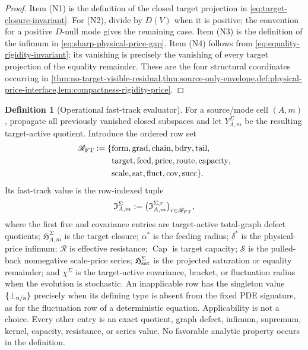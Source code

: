\documentclass[11pt]{article}
\numberwithin{section}{part}
\theoremstyle{plain}
\theoremstyle{definition}
\newtheorem{definition}[definition]{Definition}
\theoremstyle{remark}
\begin{document}
\begin{proof}
Item \textup{(N1)} is the definition of the closed target projection in
\eqref{eq:target-closure-invariant}.  For \textup{(N2)}, divide by \(D(V)\)
when it is positive; the convention for a positive \(D\)-null mode gives the
remaining case.  Item \textup{(N3)} is the definition of the infimum in
\eqref{eq:sharp-physical-price-gap}.  Item \textup{(N4)} follows from
\eqref{eq:equality-rigidity-invariant}: its vanishing is precisely the
vanishing of every target projection of the equality remainder.  These are
the four structural coordinates occurring in
\cref{thm:no-target-visible-residual,thm:source-only-envelope,def:physical-price-interface,lem:compactness-rigidity-price}.
\end{proof}

\begin{definition}[Operational fast-track evaluator]
\label{def:operational-fast-track-evaluator}
For a source/mode cell \((A,m)\), propagate all previously vanished closed
subspaces and let \(Y_{A,m}^{\Sigma}\) be the resulting target-active
quotient.  Introduce the ordered row set
\begin{equation}
 \label{eq:fast-track-row-set}
 \begin{aligned}
 \mathscr R_{\rm FT}:=\{&\mathrm{form},\mathrm{grad},\mathrm{chain},
 \mathrm{bdry},\mathrm{tail},\\
 &\mathrm{target},\mathrm{feed},\mathrm{price},\mathrm{route},
 \mathrm{capacity},\\
 &\mathrm{scale},\mathrm{sat},\mathrm{fluct},\mathrm{cov},
 \mathrm{succ}\}.
 \end{aligned}
\end{equation}
Its fast-track value is the row-indexed tuple
\begin{equation}
 \label{eq:operational-fast-track-tuple}
 \mathfrak I_{A,m}^{\Sigma}
 :=\bigl(\mathfrak I_{A,m}^{\Sigma,r}\bigr)_
       {r\in\mathscr R_{\rm FT}},
\end{equation}
where the first five and covariance entries are target-active total-graph defect
quotients; \(\mathfrak H_{A,m}^{\Sigma}\) is the target closure;
\(\alpha^*\) is the feeding radius; \(\delta^*\) is the physical-price
infimum; \(\mathcal R\) is effective resistance; \(\operatorname{Cap}\) is
target capacity; \(\mathscr S\) is the pulled-back nonnegative scale-price
series; \(\mathfrak H_{\rm sat}^{\Sigma}\) is the projected saturation or
equality remainder; and \(\chi^\Sigma\) is the target-active covariance,
bracket, or fluctuation radius when the evolution is stochastic.  An
inapplicable row has the singleton value \(\{\bot_{\rm n/a}\}\) precisely
when its defining type is absent from the fixed PDE signature, as for the
fluctuation row of a deterministic equation.  Applicability is not a choice.
Every other entry is an exact quotient, graph defect,
infimum, supremum, kernel, capacity, resistance, or series value.  No
favorable analytic property occurs in the definition.
\end{definition}
\end{document}
